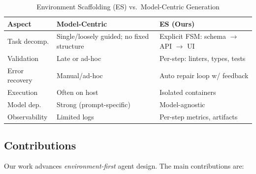 \documentclass[conference]{IEEEtran}
\begin{document}
\begin{table}[t]
\centering
\footnotesize
\begin{threeparttable}
\caption{Environment Scaffolding (ES) vs.\ Model-Centric Generation}
\label{tab:es-contrast}
\begin{tabular}{@{}p{1.8cm}p{2.8cm}p{2.8cm}@{}}
\toprule
\textbf{Aspect} & \textbf{Model-Centric} & \textbf{ES (Ours)} \\
\midrule
Task decomp. & Single/loosely guided; no fixed structure &
Explicit FSM: schema $\rightarrow$ API $\rightarrow$ UI \\
Validation & Late or ad-hoc &
Per-step: linters, types, tests \\
Error recovery & Manual/ad-hoc &
Auto repair loop w/ feedback \\
Execution & Often on host &
Isolated containers \\
Model dep. & Strong (prompt-specific) &
Model-agnostic \\
Observability & Limited logs &
Per-step metrics, artifacts \\
\bottomrule
\end{tabular}
\end{threeparttable}
\end{table}

\subsection{Contributions}

Our work advances \emph{environment-first} agent design. The main contributions are:
\end{document}
